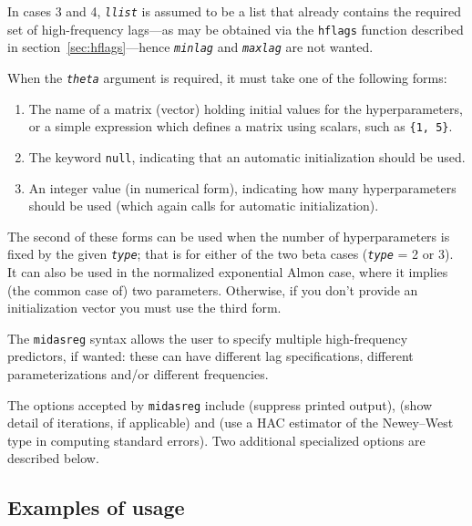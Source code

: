 \documentclass{article}
\begin{document}
In cases 3 and 4, \texttt{\textsl{llist}} is assumed to be a list that
already contains the required set of high-frequency lags---as may be
obtained via the \texttt{hflags} function described in
section~\ref{sec:hflags}---hence \texttt{\textsl{minlag}} and
\texttt{\textsl{maxlag}} are not wanted.

When the \texttt{\textsl{theta}} argument is required, it must take
one of the following forms:
\begin{enumerate}
\item The name of a matrix (vector) holding initial values for the
  hyperparameters, or a simple expression which defines a matrix
  using scalars, such as \texttt{\{1, 5\}}.
\item The keyword \texttt{null}, indicating that an automatic
  initialization should be used.
\item An integer value (in numerical form), indicating how many
  hyperparameters should be used (which again calls for
  automatic initialization).
\end{enumerate}
The second of these forms can be used when the number of
hyperparameters is fixed by the given \texttt{\textsl{type}}; that is
for either of the two beta cases (\texttt{\textsl{type}} = 2 or 3). It
can also be used in the normalized exponential Almon case, where it
implies (the common case of) two parameters.  Otherwise, if you don't
provide an initialization vector you must use the third form.

The \texttt{midasreg} syntax allows the user to specify multiple
high-frequency predictors, if wanted: these can have different lag
specifications, different parameterizations and/or different
frequencies.

The options accepted by \texttt{midasreg} include 
(suppress printed output),  (show detail of
iterations, if applicable) and  (use a HAC estimator of
the Newey--West type in computing standard errors).  Two additional
specialized options are described below.

\subsection{Examples of usage}
\end{document}
